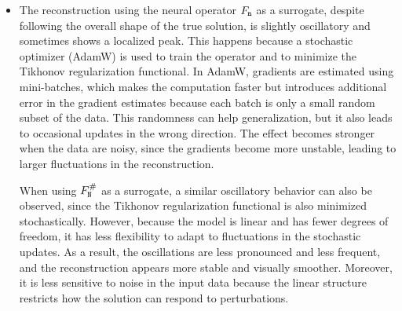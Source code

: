\documentclass[10pt]{article}
\numberwithin{equation}{section}
\theoremstyle{nonumberplain}
\newcommand{\n}{{\tt n}}
\newcommand{\no}{{\tt N}}
\begin{document}
\begin{itemize}
    Moreover, for this problems, refining the mesh improves the reconstruction accuracy for FEM. We also observe that without mollification, the reconstructions using surrogates $F_\no^\#$ and $F_\n$ exhibit strong oscillations, highlighting the importance of the mollification process for $L^2$-solutions.


	\item  The reconstruction using the neural operator $F_\n$ as a surrogate, despite following the overall shape of the true solution, is slightly oscillatory and sometimes shows a localized peak. This happens because a stochastic optimizer (AdamW) is used to train the operator and to minimize the Tikhonov regularization functional. In AdamW, gradients are estimated using mini-batches, which makes the computation faster but introduces additional error in the gradient estimates because each batch is only a small random subset of the data. This randomness can help generalization, but it also leads to occasional updates in the wrong direction. The effect becomes stronger when the data are noisy, since the gradients become more unstable, leading to larger fluctuations in the reconstruction. 

	  When using $F_\no^\#$ as a surrogate, a similar oscillatory behavior can also be observed, since the Tikhonov regularization functional is also minimized stochastically. However, because the model is linear and has fewer degrees of freedom, it has less flexibility to adapt to fluctuations in the stochastic updates. As a result, the oscillations are less pronounced and less frequent, and the reconstruction appears more stable and visually smoother. Moreover, it is less sensitive to noise in the input data because the linear structure restricts how the solution can respond to perturbations.
\end{itemize}
    
\end{document}
